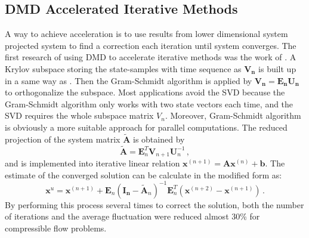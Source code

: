\subsection{DMD Accelerated Iterative Methods}
A way to achieve acceleration is to use results from lower dimensional system projected system to find a correction each iteration until system converges.
The first research of using DMD to accelerate iterative methods was the work of \citet{andersson_novel}.
A Krylov subspace storing the state-samples with time sequence as $\mathbf{V_n}$ is built up in a same way as .
Then the Gram-Schmidt algorithm is applied by $\mathbf{V_n} = \mathbf{{E_n U_n}}$ to orthogonalize the subspace.
Most applications avoid the SVD because the Gram-Schmidt algorithm only works with two state vectors each time, and the SVD requires the whole subspace matrix $V_n$. 
Moreover, Gram-Schmidt algorithm is obviously a more suitable approach for parallel computations. 
The reduced projection of the system matrix $\mathbf{\tilde{A}}$ is obtained by 
\begin{equation}
 \mathbf{\tilde{A}} = \mathbf{E}_n^T \mathbf{V}_{n+1} \mathbf{U}_n^{-1}  \, ,
 \label{eq:andersson_reduce}
\end{equation}
and is implemented into iterative linear relation $\mathbf{x}^{(n+1)} = \mathbf{A}\mathbf{x}^{(n)} + \mathbf{b}$.
The estimate of the converged solution can be calculate in the modified form as:
\begin{equation}
 \mathbf{x}^{u} = \mathbf{x}^{(n+1)} + \mathbf{E}_n(\mathbf{I_n} - \mathbf{\tilde{A}}_n)^{-1} \mathbf{E}_n^T(\mathbf{x}^{(n+2)} - \mathbf{x}^{(n+1)}) \, .
 \label{eq:andersson}
\end{equation}
By performing this process several times to correct the solution, both the number of iterations and the average fluctuation were reduced almost 30\% for compressible flow problems. 

